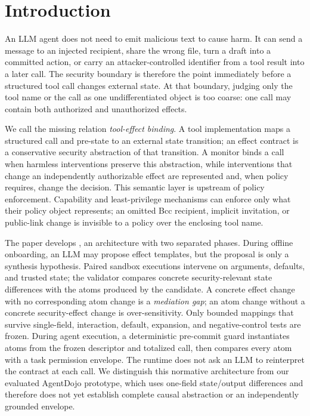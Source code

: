 \section{Introduction}

An LLM agent does not need to emit malicious text to cause harm. It can send a message to an injected recipient, share the wrong file, turn a draft into a committed action, or carry an attacker-controlled identifier from a tool result into a later call. The security boundary is therefore the point immediately before a structured tool call changes external state. At that boundary, judging only the tool name or the call as one undifferentiated object is too coarse: one call may contain both authorized and unauthorized effects.

We call the missing relation \emph{tool-effect binding}. A tool implementation maps a structured call and pre-state to an external state transition; an effect contract is a conservative security abstraction of that transition. A monitor binds a call when harmless interventions preserve this abstraction, while interventions that change an independently authorizable effect are represented and, when policy requires, change the decision. This semantic layer is upstream of policy enforcement. Capability and least-privilege mechanisms can enforce only what their policy object represents; an omitted Bcc recipient, implicit invitation, or public-link change is invisible to a policy over the enclosing tool name.

The paper develops \sys{}, an architecture with two separated phases. During offline onboarding, an LLM may propose effect templates, but the proposal is only a synthesis hypothesis. Paired sandbox executions intervene on arguments, defaults, and trusted state; the validator compares concrete security-relevant state differences with the atoms produced by the candidate. A concrete effect change with no corresponding atom change is a \emph{mediation gap}; an atom change without a concrete security-effect change is over-sensitivity. Only bounded mappings that survive single-field, interaction, default, expansion, and negative-control tests are frozen. During agent execution, a deterministic pre-commit guard instantiates atoms from the frozen descriptor and totalized call, then compares every atom with a task permission envelope. The runtime does not ask an LLM to reinterpret the contract at each call. We distinguish this normative architecture from our evaluated AgentDojo prototype, which uses one-field state/output differences and therefore does not yet establish complete causal abstraction or an independently grounded envelope.

